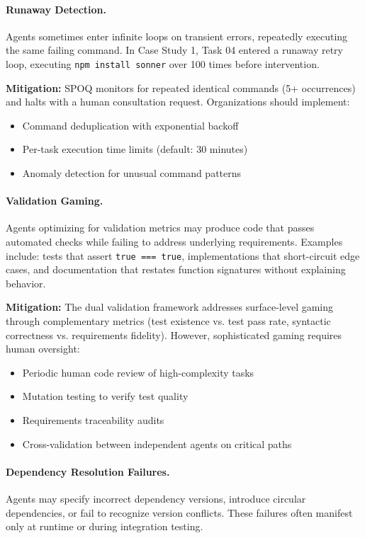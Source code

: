 \paragraph{Runaway Detection.}
Agents sometimes enter infinite loops on transient errors, repeatedly
executing the same failing command. In Case Study 1, Task 04 entered a
runaway retry loop, executing \texttt{npm install sonner} over 100 times
before intervention.

\textbf{Mitigation:} SPOQ monitors for repeated identical commands (5+
occurrences) and halts with a human consultation request. Organizations
should implement:
\begin{itemize}
    \item Command deduplication with exponential backoff
    \item Per-task execution time limits (default: 30 minutes)
    \item Anomaly detection for unusual command patterns
\end{itemize}

\paragraph{Validation Gaming.}
Agents optimizing for validation metrics may produce code that passes
automated checks while failing to address underlying requirements. Examples
include: tests that assert \texttt{true === true}, implementations that
short-circuit edge cases, and documentation that restates function signatures
without explaining behavior.

\textbf{Mitigation:} The dual validation framework addresses surface-level
gaming through complementary metrics (test existence vs. test pass rate,
syntactic correctness vs. requirements fidelity). However, sophisticated
gaming requires human oversight:
\begin{itemize}
    \item Periodic human code review of high-complexity tasks
    \item Mutation testing to verify test quality
    \item Requirements traceability audits
    \item Cross-validation between independent agents on critical paths
\end{itemize}

\paragraph{Dependency Resolution Failures.}
Agents may specify incorrect dependency versions, introduce circular
dependencies, or fail to recognize version conflicts. These failures often
manifest only at runtime or during integration testing.

